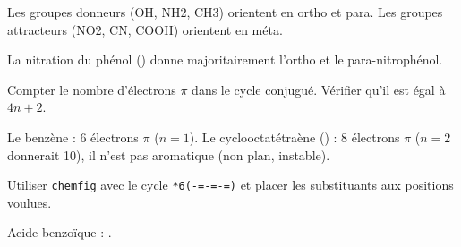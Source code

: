 Les groupes donneurs (OH, NH2, CH3) orientent en ortho et para. Les groupes attracteurs (NO2, CN, COOH) orientent en méta.

\begin{exemple}
La nitration du phénol () donne majoritairement l'ortho et le para-nitrophénol.
\end{exemple}

Compter le nombre d'électrons $\pi$ dans le cycle conjugué. Vérifier qu'il est égal à $4n+2$.

\begin{exemple}
Le benzène : 6 électrons $\pi$ ($n=1$). Le cyclooctatétraène () : 8 électrons $\pi$ ($n=2$ donnerait 10), il n'est pas aromatique (non plan, instable).
\end{exemple}

Utiliser \texttt{chemfig} avec le cycle \texttt{*6(-=-=-=)} et placer les substituants aux positions voulues.

\begin{exemple}
Acide benzoïque : .
\end{exemple}